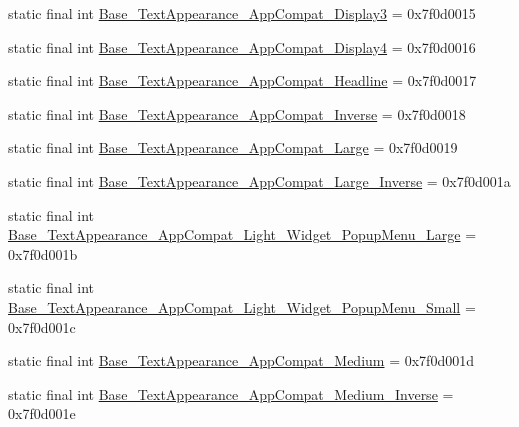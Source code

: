 \begin{DoxyCompactItemize}
\item 
static final int \mbox{\hyperlink{classandroid_1_1support_1_1v7_1_1appcompat_1_1_r_1_1style_a0380dc8d70a5eb7c2607df2a22960d42}{Base\+\_\+\+Text\+Appearance\+\_\+\+App\+Compat\+\_\+\+Display3}} = 0x7f0d0015
\item 
static final int \mbox{\hyperlink{classandroid_1_1support_1_1v7_1_1appcompat_1_1_r_1_1style_a6cddb219261317aad3f4db784e410f78}{Base\+\_\+\+Text\+Appearance\+\_\+\+App\+Compat\+\_\+\+Display4}} = 0x7f0d0016
\item 
static final int \mbox{\hyperlink{classandroid_1_1support_1_1v7_1_1appcompat_1_1_r_1_1style_a76b5b2690dec115d1cb2ab231a53b3e3}{Base\+\_\+\+Text\+Appearance\+\_\+\+App\+Compat\+\_\+\+Headline}} = 0x7f0d0017
\item 
static final int \mbox{\hyperlink{classandroid_1_1support_1_1v7_1_1appcompat_1_1_r_1_1style_ac1b8f71eef0cfd92420b53d40b848492}{Base\+\_\+\+Text\+Appearance\+\_\+\+App\+Compat\+\_\+\+Inverse}} = 0x7f0d0018
\item 
static final int \mbox{\hyperlink{classandroid_1_1support_1_1v7_1_1appcompat_1_1_r_1_1style_ac0e1bd870f1c3957fda8a93a43cc2248}{Base\+\_\+\+Text\+Appearance\+\_\+\+App\+Compat\+\_\+\+Large}} = 0x7f0d0019
\item 
static final int \mbox{\hyperlink{classandroid_1_1support_1_1v7_1_1appcompat_1_1_r_1_1style_a952c581262566629af4bcce8dcb124fe}{Base\+\_\+\+Text\+Appearance\+\_\+\+App\+Compat\+\_\+\+Large\+\_\+\+Inverse}} = 0x7f0d001a
\item 
static final int \mbox{\hyperlink{classandroid_1_1support_1_1v7_1_1appcompat_1_1_r_1_1style_a7bdfa04a7bd06b56701a037df0d1d2df}{Base\+\_\+\+Text\+Appearance\+\_\+\+App\+Compat\+\_\+\+Light\+\_\+\+Widget\+\_\+\+Popup\+Menu\+\_\+\+Large}} = 0x7f0d001b
\item 
static final int \mbox{\hyperlink{classandroid_1_1support_1_1v7_1_1appcompat_1_1_r_1_1style_acf3a49f92e11ba58887e56c6237d01b2}{Base\+\_\+\+Text\+Appearance\+\_\+\+App\+Compat\+\_\+\+Light\+\_\+\+Widget\+\_\+\+Popup\+Menu\+\_\+\+Small}} = 0x7f0d001c
\item 
static final int \mbox{\hyperlink{classandroid_1_1support_1_1v7_1_1appcompat_1_1_r_1_1style_a052584a879536e446cb21f559053a2fd}{Base\+\_\+\+Text\+Appearance\+\_\+\+App\+Compat\+\_\+\+Medium}} = 0x7f0d001d
\item 
static final int \mbox{\hyperlink{classandroid_1_1support_1_1v7_1_1appcompat_1_1_r_1_1style_a94e8c40fadcc9eea80252cf4e36c4568}{Base\+\_\+\+Text\+Appearance\+\_\+\+App\+Compat\+\_\+\+Medium\+\_\+\+Inverse}} = 0x7f0d001e

\end{DoxyCompactItemize}

